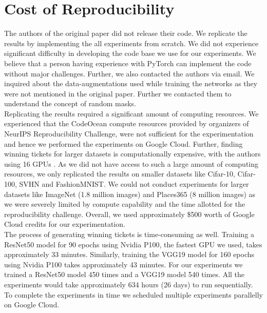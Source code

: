     
    
    
    
    
    
    \section{Cost of Reproducibility}
    \label{sec:cost}
    The authors of the original paper \cite{repro_paper} did not release their code. We replicate the results by implementing the all experiments from scratch. We did not experience significant difficulty in developing the code base we use for our experiments. We believe that a person having experience with PyTorch  can implement the code without major challenges. Further, we also contacted the authors via email. We inquired about the data-augmentations used while training the networks as they were not mentioned in the original paper. Further we contacted them to understand the concept of random masks.\\
    
    Replicating the results required a significant amount of computing resources. We experienced that the CodeOcean compute resources provided by organizers of NeurIPS Reproducibility Challenge,  were not sufficient for the experimentation and hence we performed the experiments on Google Cloud. Further, finding winning tickets for larger datasets is computationally expensive, with the authors using 16 GPUs \cite{repro_paper}. As we did not have access to such a large amount of computing resources, we only replicated the results on smaller datasets like Cifar-10, Cifar-100, SVHN and FashionMNIST. We could not conduct experiments for larger datasets like ImageNet (1.8 million images) \cite{imagenet} and Places365 (8 million images) \cite{places365} as we were severely limited by compute capability and the time allotted for the reproducibility challenge. Overall, we used  approximately \$500 worth of Google Cloud credits for our experimentation.\\
    
    The process of generating winning tickets is time-consuming as well. Training a ResNet50 model for 90 epochs using Nvidia P100, the fastest GPU we used, takes approximately 33 minutes. Similarly, training the VGG19 model for 160 epochs using Nvidia P100 takes approximately 43 minutes. For our experiments we trained a ResNet50 model 450 times and a VGG19 model 540 times. All the experiments would take approximately 634 hours (26 days) to run sequentially. To complete the experiments in time we scheduled multiple experiments parallelly on Google Cloud.\\ 
    
